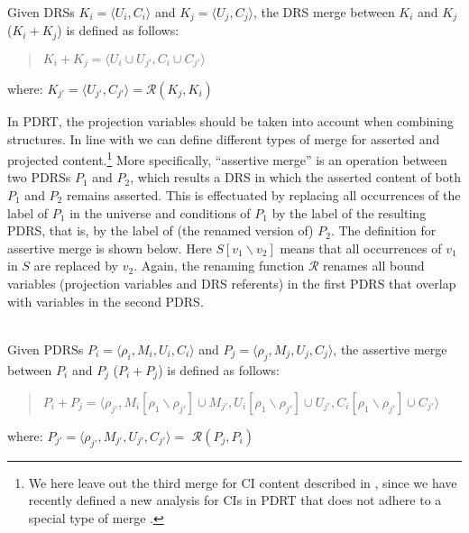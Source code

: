 \begin{definition}~\\
Given DRSs $K_i=\langle U_i,C_i \rangle$ and $K_j=\langle U_j,C_j \rangle$,
the DRS merge between $K_i$ and $K_j$ ($K_i + K_j$) is defined as follows:
  \begin{quote}
    $K_i + K_j = 
    \langle U_i\cup U_{j'},C_i \cup C_{j'}\rangle$
  \end{quote}
  where: $K_{j'} = \langle U_{j'},C_{j'} \rangle = \mathcal{R}(K_j,K_i)$
\end{definition}

In PDRT, the projection variables should be taken into account when
combining structures.  In line with  we can
define different types of merge for asserted and projected
content.\footnote{We here leave out the third merge for CI content described
in , since we have recently defined a new
analysis for CIs in PDRT that does not adhere to a special type of merge
\cite{venhuizenInPrepSALT}.} More specifically, ``assertive merge'' is an
operation between two PDRSs $P_1$ and $P_2$, which results a DRS in which
the asserted content of both $P_1$ and $P_2$ remains asserted. This is
effectuated by replacing all occurrences of the label of $P_1$ in the
universe and conditions of $P_1$ by the label of the resulting PDRS, that
is, by the label of (the renamed version of) $P_2$. The definition for
assertive merge is shown below. Here $S[v_1\backslash v_2]$ means that all
occurrences of $v_1$ in $S$ are replaced by $v_2$. Again, the renaming
function $\mathcal{R}$ renames all bound variables (projection variables and
DRS referents) in the first PDRS that overlap with variables in the second
PDRS.

\begin{definition}~\\
Given PDRSs $P_i=\langle \rho_i,M_i,U_i,C_i \rangle$ and
$P_j=\langle \rho_j,M_j,U_j,C_j \rangle$, the assertive merge between $P_i$
and $P_j$ ($P_i + P_j$) is defined as follows:
  \begin{quote}
    $P_i + P_j = 
      \langle \rho_{j'}, 
      M_{i}[\rho_1\backslash\rho_{j'}] \cup M_{j'},
      U_{i}[\rho_1\backslash\rho_{j'}] \cup U_{j'},
      C_{i}[\rho_1\backslash\rho_{j'}] \cup C_{j'}\rangle$
  \end{quote}
  where: $P_{j'} = \langle \rho_{j'}, M_{j'}, U_{j'}, C_{j'} \rangle =$
      $\mathcal{R}(P_j,P_i)$
\end{definition}

